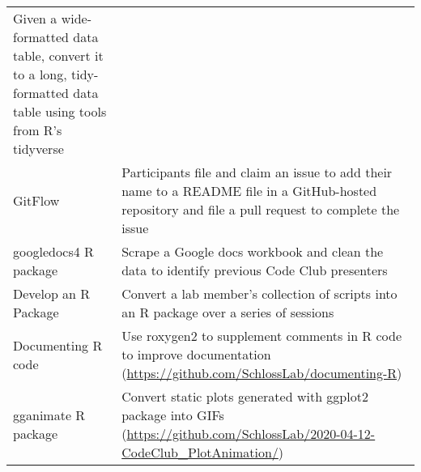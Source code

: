 \documentclass[
  11pt,
]{article}
\begin{document}
\begin{longtable}[]{@{}ll@{}}
\begin{minipage}[t]{0.69\columnwidth}
Given a wide-formatted data table, convert it to a long, tidy-formatted
data table using tools from R's tidyverse\strut
\end{minipage}\tabularnewline
\begin{minipage}[t]{0.25\columnwidth}\raggedright
GitFlow\strut
\end{minipage} & \begin{minipage}[t]{0.69\columnwidth}\raggedright
Participants file and claim an issue to add their name to a README file
in a GitHub-hosted repository and file a pull request to complete the
issue\strut
\end{minipage}\tabularnewline
\begin{minipage}[t]{0.25\columnwidth}\raggedright
googledocs4 R package\strut
\end{minipage} & \begin{minipage}[t]{0.69\columnwidth}\raggedright
Scrape a Google docs workbook and clean the data to identify previous
Code Club presenters\strut
\end{minipage}\tabularnewline
\begin{minipage}[t]{0.25\columnwidth}\raggedright
Develop an R Package\strut
\end{minipage} & \begin{minipage}[t]{0.69\columnwidth}\raggedright
Convert a lab member's collection of scripts into an R package over a
series of sessions\strut
\end{minipage}\tabularnewline
\begin{minipage}[t]{0.25\columnwidth}\raggedright
Documenting R code\strut
\end{minipage} & \begin{minipage}[t]{0.69\columnwidth}\raggedright
Use roxygen2 to supplement comments in R code to improve documentation
(\url{https://github.com/SchlossLab/documenting-R})\strut
\end{minipage}\tabularnewline
\begin{minipage}[t]{0.25\columnwidth}\raggedright
gganimate R package\strut
\end{minipage} & \begin{minipage}[t]{0.69\columnwidth}\raggedright
Convert static plots generated with ggplot2 package into GIFs
(\url{https://github.com/SchlossLab/2020-04-12-CodeClub_PlotAnimation/})\strut
\end{minipage}\tabularnewline
\bottomrule
\end{longtable}
\end{document}
